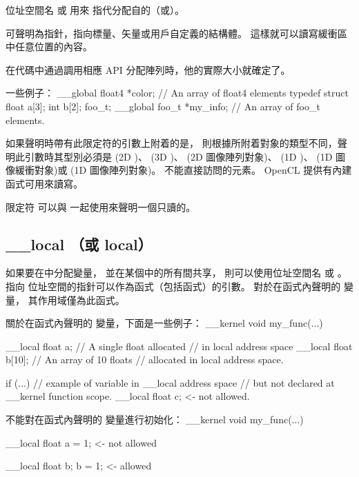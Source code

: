 位址空間名  或  用來
指代分配自的（或）。

 可聲明為指針，指向標量、矢量或用戶自定義的結構體。
這樣就可以讀寫緩衝區中任意位置的內容。

在代碼中通過調用相應 API 分配陣列時，他的實際大小就確定了。

一些例子：
\startclc
__global float4	*color;		// An array of float4 elements
typedef struct {
	float	a[3];
	int	b[2];
} foo_t;
__global foo_t	*my_info;	// An array of foo_t elements.
\stopclc

如果聲明時帶有此限定符的引數上附着的是，
則根據所附着對象的類型不同，聲明此引數時其型別必須是
  (2D )、  (3D )、
  (2D 圖像陣列對象)、  (1D )、
  (1D 圖像緩衝對象)或  (1D 圖像陣列對象)。
不能直接訪問的元素。 OpenCL 提供有內建函式可用來讀寫。

限定符  可以與  一起使用來聲明一個只讀的。

\subsection{__local （或 local）}

如果要在中分配變量，
並在某個中的所有間共享，
則可以使用位址空間名  或 。
指向  位址空間的指針可以作為函式（包括函式）的引數。
對於在函式內聲明的  變量，
其作用域僅為此函式。

關於在函式內聲明的  變量，下面是一些例子：
\startclc
__kernel void my_func(...)
{
	__local float	a;	// A single float allocated
				// in local address space
	__local float	b[10];	// An array of 10 floats
				// allocated in local address space.

	if (...)
	{
		// example of variable in __local address space
		// but not declared at __kernel function scope.
		__local float	c;	<- not allowed.
	}
}
\stopclc

不能對在函式內聲明的  變量進行初始化：
\startclc
__kernel void my_func(...)
{
	__local float	a = 1;	<- not allowed

	__local float	b;
	b = 1;			<- allowed
}
\stopclc

